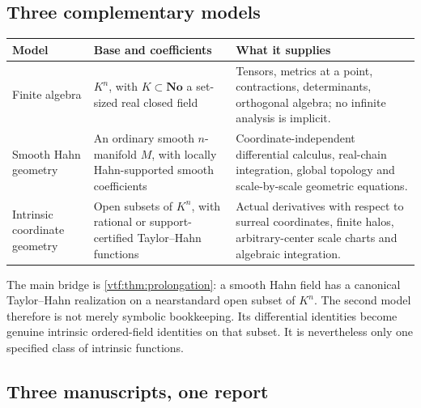 \documentclass[11pt,letterpaper]{article}
\theoremstyle{definition}
\theoremstyle{remark}
\newcommand{\No}{\mathbf{No}}
\begin{document}
\subsection{Three complementary models}

\begin{center}\small
\begin{tabular}{P{0.17\textwidth}P{0.28\textwidth}P{0.43\textwidth}}
\toprule
Model & Base and coefficients & What it supplies\\
\midrule
Finite algebra & $K^n$, with $K\subset\No$ a set-sized real closed field &
Tensors, metrics at a point, contractions, determinants, orthogonal algebra;
no infinite analysis is implicit.\\
Smooth Hahn geometry & An ordinary smooth $n$-manifold $M$, with locally
Hahn-supported smooth coefficients & Coordinate-independent differential
calculus, real-chain integration, global topology and scale-by-scale
geometric equations.\\
Intrinsic coordinate geometry & Open subsets of $K^n$, with rational or
support-certified Taylor--Hahn functions & Actual derivatives with respect
to surreal coordinates, finite halos, arbitrary-center scale charts and
algebraic integration.\\
\bottomrule
\end{tabular}
\end{center}

The main bridge is \cref{vtf:thm:prolongation}: a smooth Hahn field has a canonical
Taylor--Hahn realization on a nearstandard open subset of $K^n$. The second
model therefore is not merely symbolic bookkeeping. Its differential
identities become genuine intrinsic ordered-field identities on that subset.
It is nevertheless only one specified class of intrinsic functions.

\subsection{Three manuscripts, one report}\label{vtf:subsec:merge}
\end{document}
